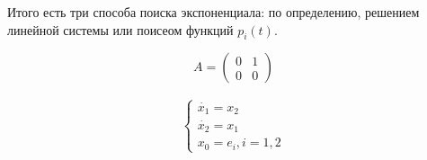 Итого есть три способа поиска экспоненциала: по определению, решением линейной системы или поисеом функций $p_i(t)$.

\begin{exmp}
    \begin{equation*}
        A = \left( \begin{matrix}
            0 & 1 \\
            0 & 0
        \end{matrix} \right)
    \end{equation*}

    \begin{gather*}
        \begin{cases}
            \dot{x_1} = x_2 \\
            \dot{x_2} = x_1 \\
            x_0 = e_i, i = 1, 2
        \end{cases}
    \end{gather*}


\end{exmp}
